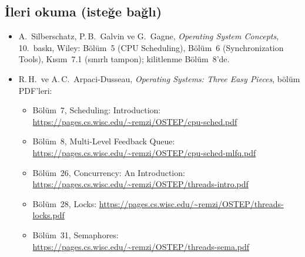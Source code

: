\subsection*{İleri okuma (isteğe bağlı)}
{\small
\begin{itemize}[itemsep=0.1em]
  \item A.\ Silberschatz, P.\,B.\ Galvin ve G.\ Gagne, \emph{Operating System Concepts}, 10.\ baskı, Wiley: Bölüm~5 (CPU Scheduling), Bölüm~6 (Synchronization Tools), Kısım~7.1 (sınırlı tampon); kilitlenme Bölüm~8'de.
  \item R.\,H.\ ve A.\,C.\ Arpaci-Dusseau, \emph{Operating Systems: Three Easy Pieces}, bölüm PDF'leri:
  \begin{itemize}[itemsep=0em]
    \item Bölüm~7, Scheduling: Introduction: \url{https://pages.cs.wisc.edu/~remzi/OSTEP/cpu-sched.pdf}
    \item Bölüm~8, Multi-Level Feedback Queue: \url{https://pages.cs.wisc.edu/~remzi/OSTEP/cpu-sched-mlfq.pdf}
    \item Bölüm~26, Concurrency: An Introduction: \url{https://pages.cs.wisc.edu/~remzi/OSTEP/threads-intro.pdf}
    \item Bölüm~28, Locks: \url{https://pages.cs.wisc.edu/~remzi/OSTEP/threads-locks.pdf}
    \item Bölüm~31, Semaphores: \url{https://pages.cs.wisc.edu/~remzi/OSTEP/threads-sema.pdf}
  \end{itemize}
\end{itemize}}

